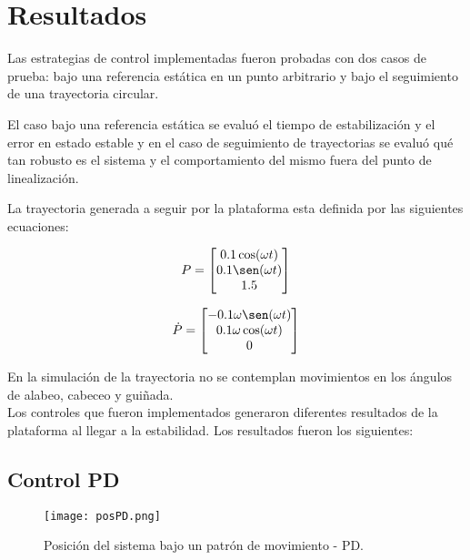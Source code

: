 
\section{Resultados}

Las estrategias de control implementadas fueron probadas con dos casos de prueba: bajo una referencia estática en un punto arbitrario y bajo el seguimiento de una trayectoria circular.

El caso bajo una referencia estática se evaluó el tiempo de estabilización y el error en estado estable y en el caso de seguimiento de trayectorias se evaluó qué tan robusto es el sistema y el comportamiento del mismo fuera del punto de linealización.

La trayectoria generada a seguir por la plataforma esta definida por las siguientes ecuaciones:

\begin{equation}
    P = \begin{bmatrix}
    0.1 \cos (\omega t) \\
    0.1 \sen (\omega t) \\
    1.5
    \end{bmatrix}
\end{equation}

\begin{equation}
    \dot{P} = \begin{bmatrix}
    -0.1 \omega \sen (\omega t) \\
    0.1 \omega \cos (\omega t) \\
    0
    \end{bmatrix}
\end{equation}

En la simulación de la trayectoria no se contemplan movimientos en los ángulos de alabeo, cabeceo y guiñada.\\

Los controles que fueron implementados generaron diferentes resultados de la plataforma al llegar a la estabilidad. Los resultados fueron los siguientes:

\subsection{Control PD}

\begin{figure}[h]
    \centering
    \texttt{[image: posPD.png]}
    \caption{Posición del sistema bajo un patrón de movimiento - PD.}
    \label{fig:PD position}
\end{figure}

